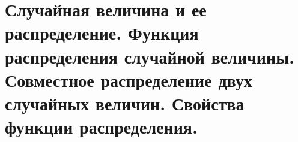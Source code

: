 \section{Случайная величина и ее распределение. Функция распределения случайной величины. Совместное распределение двух случайных величин. Свойства функции распределения.}